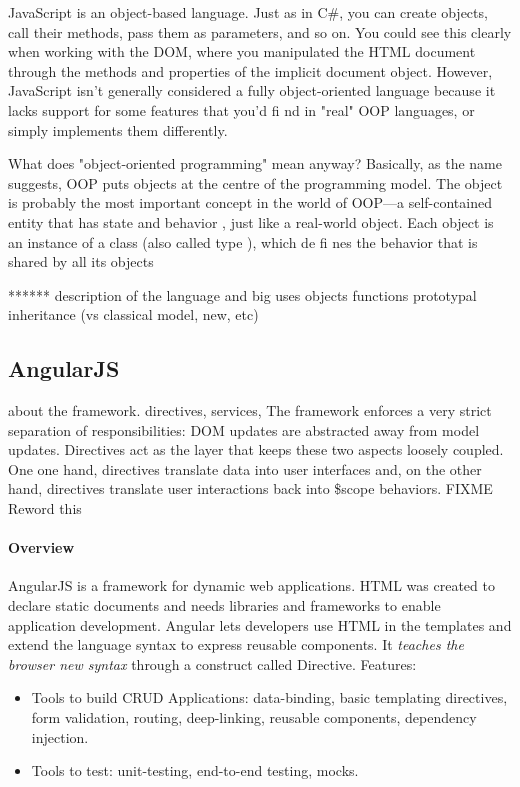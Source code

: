 JavaScript is an
object-based
language. Just as in C\#, you can create objects, call their
methods, pass them as parameters, and so on. You could see this clearly when working
with the DOM, where you manipulated the HTML document through the methods
and properties of the implicit
document
object. However, JavaScript isn't generally
considered a fully object-oriented language because it lacks support for some features
that you'd
fi
nd in "real" OOP languages, or simply implements them differently.

 What does "object-oriented programming" mean anyway? Basically, as the name
suggests, OOP puts objects at the centre of the programming model. The
object
is
probably the most important concept in the world of OOP—a self-contained entity
that has
state
and
behavior
, just like a real-world object. Each object is an instance of a
class
(also called
type
), which de
fi
nes the behavior that is shared by all its objects


******
description of the language and big uses
objects
functions
prototypal inheritance (vs classical model, new, etc)


\subsection{AngularJS}
about the framework. directives, services, 
The framework enforces a very strict separation of responsibilities: \ac{DOM} updates are abstracted away from model updates. 
Directives act as the layer that keeps these two aspects loosely coupled.
One one hand, directives translate data into user interfaces and, on the other hand, directives translate user interactions back into \$scope behaviors. FIXME Reword this

\paragraph{Overview} AngularJS is a framework for dynamic web applications.
\ac{HTML} was created to declare static documents and needs libraries and frameworks to enable application development.
Angular lets developers use \ac{HTML} in the templates and extend the language syntax to express reusable components.
It \textit{teaches the browser new syntax} through a construct called Directive.
Features:
\begin{itemize}
    \item Tools to build \ac{CRUD} Applications: data-binding, basic templating directives, form validation, routing, deep-linking, reusable components, dependency injection.
    \item Tools to test: unit-testing, end-to-end testing, mocks.
\end{itemize}

